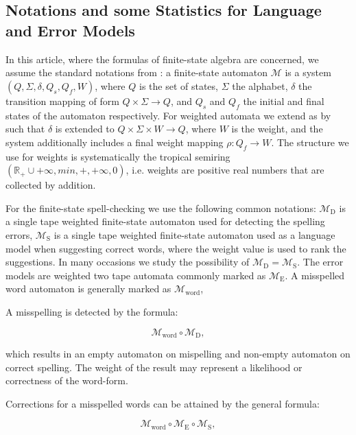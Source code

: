 \documentclass[a4paper,12pt]{article}
\begin{document}
\subsection{Notations and some Statistics for Language and Error Models}
\label{subsec:theory}

In this article, where the formulas of finite-state algebra are concerned, we
assume the standard notations from \cite{aho2007compilers}: a
finite-state automaton $\mathcal{M}$ is a system $(Q, \Sigma, \delta, Q_s, Q_f,
W)$, where $Q$ is the set of states, $\Sigma$ the alphabet, $\delta$ the
transition mapping of form $Q \times \Sigma \rightarrow Q$, and $Q_s$ and $Q_f$
the initial and final states of the automaton respectively. For weighted
automata we extend as by \cite{mohri2009weighted} such that $\delta$ is
extended to $Q \times \Sigma \times W \rightarrow Q$, where $W$ is the
weight, and the system additionally includes a final weight mapping $\rho: Q_f
\rightarrow W$. The structure we use for weights is systematically the tropical
semiring $(\mathbb{R}_+ \cup {+\infty}, min, +, +\infty, 0)$, i.e. weights are
positive real numbers that are collected by addition.

For the finite-state spell-checking we use the following common notations:
$\mathcal{M}_\mathrm{D}$ is a single tape weighted finite-state automaton used
for detecting the spelling errors, $\mathcal{M}_\mathrm{S}$ is a single tape
weighted finite-state automaton used as a language model when suggesting
correct words, where the weight value is used to rank the suggestions. In many
occasions we study the possibility of $\mathcal{M}_\mathrm{D} =
\mathcal{M}_\mathrm{S}$. The error models are weighted two tape automata
commonly marked as $\mathcal{M}_\mathrm{E}$. A misspelled word automaton is
generally marked as $\mathcal{M}_\mathrm{word}$,

A misspelling is detected by the formula:

\begin{equation}
    \label{formula:detection}
    \mathcal{M}_{\mathrm{word}} \circ \mathcal{M}_\mathrm{D},
\end{equation}

which results in an empty automaton on mispelling and non-empty automaton on
correct spelling. The weight of the result may represent a likelihood or
correctness of the word-form.

Corrections for a misspelled words can be attained by the general formula:

\begin{equation}
    \label{formula:correction}
    \mathcal{M}_{\mathrm{word}} \circ \mathcal{M}_{\mathrm{E}} \circ \mathcal{M}_{\mathrm{S}},
\end{equation}
\end{document}

